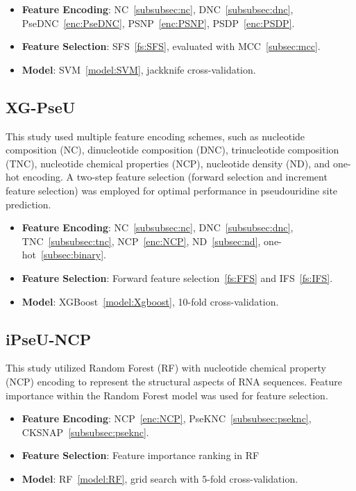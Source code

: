       \begin{itemize}
        \item \textbf{Feature Encoding}: NC~\ref{subsubsec:nc}, DNC~\ref{subsubsec:dnc}, PseDNC~\ref{enc:PseDNC}, PSNP~\ref{enc:PSNP}, PSDP~\ref{enc:PSDP}.
        \item \textbf{Feature Selection}: SFS~\ref{fs:SFS}, evaluated with MCC~\ref{subsec:mcc}.
        \item \textbf{Model}: SVM~\ref{model:SVM}, jackknife cross-validation.
      \end{itemize}

    \subsection*{XG-PseU \cite{liu_xg-pseu_2020}}\label{subsec:XG-PseU}
      This study used multiple feature encoding schemes, such as nucleotide composition (NC), dinucleotide composition (DNC), trinucleotide composition (TNC), nucleotide chemical properties (NCP), nucleotide density (ND), and one-hot encoding.
      A two-step feature selection (forward selection and increment feature selection) was employed for optimal performance in pseudouridine site prediction.

      \begin{itemize}
        \item \textbf{Feature Encoding}: NC~\ref{subsubsec:nc}, DNC~\ref{subsubsec:dnc}, TNC~\ref{subsubsec:tnc}, NCP~\ref{enc:NCP}, ND~\ref{subsec:nd}, one-hot~\ref{subsec:binary}.
        \item \textbf{Feature Selection}: Forward feature selection~\ref{fs:FFS} and IFS~\ref{fs:IFS}.
        \item \textbf{Model}: XGBoost~\ref{model:Xgboost}, 10-fold cross-validation.
      \end{itemize}

    \subsection*{iPseU-NCP \cite{nguyen-vo_ipseu-ncp_2019}}\label{subsec:ipseu_ncp}
      This study utilized Random Forest (RF) with nucleotide chemical property (NCP) encoding to represent the structural aspects of RNA sequences.
      Feature importance within the Random Forest model was used for feature selection.

      \begin{itemize}
        \item \textbf{Feature Encoding}: NCP~\ref{enc:NCP}, PseKNC~\ref{subsubsec:pseknc}, CKSNAP~\ref{subsubsec:pseknc}.
        \item \textbf{Feature Selection}: Feature importance ranking in RF
        \item \textbf{Model}: RF~\ref{model:RF}, grid search with 5-fold cross-validation.
      \end{itemize}

